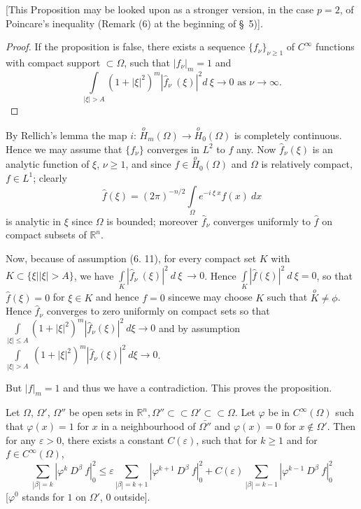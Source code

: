 [This Proposition may be looked upon as a stronger version, in the
  case $p = 2$, of Poincare's inequality (Remark (6) at the beginning
  of \S\ 5)]. 

\begin{proof}%
  If the proposition is false, there exists a sequence $\{
  f_\nu\}_{\nu \geq 1}$ of $C^\infty$ functions with compact support
  $\subset \Omega$, such that $| f_\nu |_m = 1$ and  
  \begin{equation}
    \int\limits_{| \xi | > A} (1 + | \xi |^2)^m | \hat{f}_\nu ~ ( \xi
    ) |^2 d ~ \xi \rightarrow 0 \text{ as } \nu \rightarrow \infty
    . \tag{6.1}\label{chap3:sec6:eq6.1} 
  \end{equation}
\end{proof}

By Rellich's lemma the map $i$: $\overset{o}{H}_m (\Omega )
\rightarrow \overset{o}{H}_0 (\Omega )$ is completely
continuous. Hence we may assume that $\{f_\nu \}$ converges in $L^2$
to $f$ any. Now $\hat{f}_\nu (\xi)$ is an analytic function of $\xi$,
$\nu \geq 1$, and since $f \in \overset{o}{H}_0 (\Omega)$ and $\Omega$
is relatively compact, $f \in L^1$; clearly 
$$
\hat{f} (\xi) = (2\pi)^{-n/2} \int\limits_{\Omega} e^{- i ~ \xi ~ x} f(x) ~ dx
$$
is analytic in $\xi$ since $\Omega$ is bounded; moreover $\hat{f}_\nu$
converges uniformly to $\hat{f}$ on compact subsets of
$\mathbb{R}^n$. 

Now, because of assumption (6. 11), for every compact set $K$ with $K
\subset \{ \xi | | \xi | > A\}$, we have $\int\limits_{K} |
\hat{f}_\nu ~ (\xi) |^2 ~ d ~ \xi ~ \rightarrow 0$. Hence
$\int\limits_K | \hat{f}(\xi) |^2 ~ d ~\xi = 0$, so that $\hat{f}(\xi)
= 0$ for $\xi \in K$ and hence $f = 0$ since\pageoriginale we may choose $K$ such
that $\overset{o}{K} \neq \phi$. Hence $\hat{f}_\nu$ converges to zero
uniformly on compact sets so that $\int\limits_{| \xi | \leq A} (1+ |
\xi |^2)^m | \hat{f}_\nu (\xi)|^2 ~ d\xi \rightarrow 0$ and by
assumption $\int\limits_{| \xi | > A} ~ ( 1 + | \xi |^2)^m |
\hat{f}_\nu (\xi)|^2 ~ d \xi \rightarrow 0$. 

But $| f |_m = 1$ and thus we have a contradiction. This proves the
proposition. 

\setcounter{lemma}{0}
\begin{lemma}\label{chap3:sec6:lem1}%
  Let $\Omega$, $\Omega'$, $\Omega''$ be open sets in $\mathbb{R}^n,
  \Omega'' \subset\subset \Omega' \subset\subset \Omega$. Let $\varphi$ be in
  $C^\infty (\Omega )$ such that $\varphi (x) = 1$ for $x$ in a
  neighbourhood of $\bar{\Omega''}$ and $\varphi (x) = 0$ for $x
  \notin \Omega'$. Then for any $\varepsilon > 0$, there exists a
  constant $C(\varepsilon )$, such that  for $k \geq 1$ and for $f \in
  C^\infty (\Omega )$, 
  $$
  \sum_{| \beta | = k} | \varphi^k ~ D^\beta ~ f|^2_0 \leq \varepsilon
  \sum_{| \beta | = k +1} | \varphi^{k+1} ~ D^\beta ~ f |^2_0 +
  C(\varepsilon) \sum_{| \beta | = k -1} | \varphi^{k-1} ~ D^\beta ~
  f|^2_0 
  $$
  [$\varphi^0$ stands for $1$ on $\Omega'$, $0$ outside].
\end{lemma}

